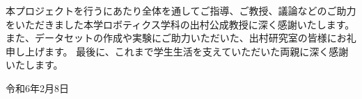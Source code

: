 \indent
本プロジェクトを行うにあたり全体を通してご指導、ご教授、議論などのご助力をいただきました本学ロボティクス学科の出村公成教授に深く感謝いたします。
また、データセットの作成や実験にご助力いただいた、出村研究室の皆様にお礼申し上げます。
最後に、これまで学生生活を支えていただいた両親に深く感謝いたします。

\begin{flushright}
令和6年2月8日
\end{flushright}
